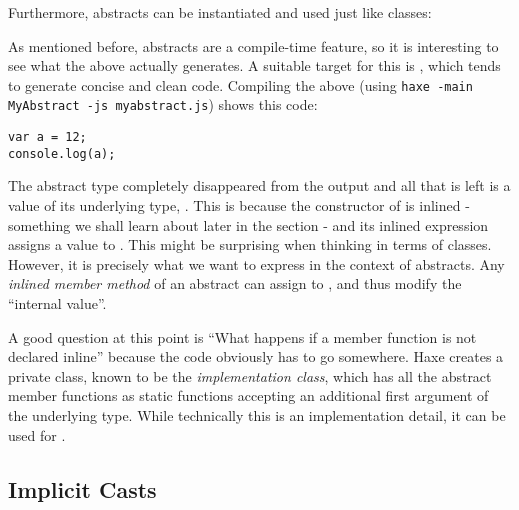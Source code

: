 Furthermore, abstracts can be instantiated and used just like classes:

As mentioned before, abstracts are a compile-time feature, so it is interesting to see what the above actually generates. A suitable target for this is , which tends to generate concise and clean code. Compiling the above (using \texttt{haxe -main MyAbstract -js myabstract.js}) shows this  code:

\begin{lstlisting}
var a = 12;
console.log(a);
\end{lstlisting}
The abstract type  completely disappeared from the output and all that is left is a value of its underlying type, . This is because the constructor of  is inlined - something we shall learn about later in the section  - and its inlined expression assigns a value to . This might be surprising when thinking in terms of classes. However, it is precisely what we want to express in the context of abstracts. Any \emph{inlined member method} of an abstract can assign to , and thus modify the ``internal value''.


A good question at this point is ``What happens if a member function is not declared inline'' because the code obviously has to go somewhere. Haxe creates a private class, known to be the \emph{implementation class}, which has all the abstract member functions as static functions accepting an additional first argument  of the underlying type. While technically this is an implementation detail, it can be used for .







\subsection{Implicit Casts}
\label{types-abstract-implicit-casts}

